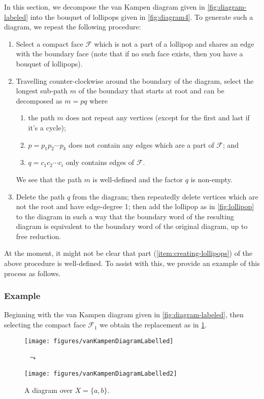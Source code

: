 \documentclass[11pt,a4paper,reqno]{amsart}
\theoremstyle{plain}
\theoremstyle{definition}
\theoremstyle{definition}
\begin{document}
In this section, we decompose the van Kampen diagram given in \cref{fig:diagram-labeled} into the bouquet of lollipops given in \cref{fig:diagram4}.
To generate such a diagram, we repeat the following procedure:
\begin{enumerate}
	\item Select a compact face $\mathcal F$ which is not a part of a lollipop and shares an edge with the boundary face (note that if no such face exists, then you have a bouquet of lollipops).
	\item Travelling counter-clockwise around the boundary of the diagram, select the longest sub-path $m$ of the boundary that starts at root and can be decomposed as $m = pq$ where
	      \begin{enumerate}
		      \item the path $m$ does not repeat any vertices (except for the first and last if it's a cycle);
		      \item $p = p_1p_2\cdots p_k$ does not contain any edges which are a part of $\mathcal F$; and
		      \item $q=c_1 c_2\cdots c_i$ only contains edges of $\mathcal F$.
	      \end{enumerate}
	      We see that the path $m$ is well-defined and the factor $q$ is non-empty.
	      \item\label{item:creating-lollipops} Delete the path $q$ from the diagram; then repeatedly delete vertices which are not the root and have edge-degree 1; then add the lollipop as in \cref{fig:lollipop} to the diagram in such a way that the boundary word of the resulting diagram is equivalent to the boundary word of the original diagram, up to free reduction.
\end{enumerate}
At the moment, it might not be clear that part (\ref{item:creating-lollipops}) of the above procedure is well-defined.
To assist with this, we provide an example of this process as follows.

\subsubsection{Example}

Beginning with the van Kampen diagram given in \cref{fig:diagram-labeled}, then selecting the compact face $\mathcal F_1$ we obtain the replacement as in \cref{fig:diagram2}.

\begin{figure}[ht!]
	\centering
	\begin{minipage}{.4\linewidth}
		\texttt{[image: figures/vanKampenDiagramLabelled]}
		\hfill
	\end{minipage}
	~{\Large$\leadsto$}~
	\begin{minipage}{.4\linewidth}
		\hfill
		\texttt{[image: figures/vanKampenDiagramLabelled2]}
	\end{minipage}
	\caption{A diagram over $X = \{a,b\}$.}\label{fig:diagram2}
\end{figure}
\end{document}
